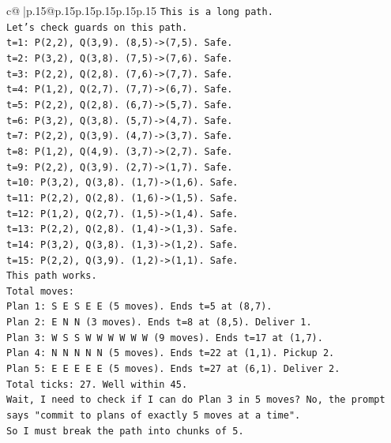 \documentclass{article}
\begin{document}
{\begin{supertabular}{c@{$\;$}|p{.15\linewidth}@{}p{.15\linewidth}p{.15\linewidth}p{.15\linewidth}p{.15\linewidth}p{.15\linewidth}}
{{{\texttt{This is a long path.} \\
\texttt{Let's check guards on this path.} \\
\texttt{t=1: P(2,2), Q(3,9). (8,5){-}>(7,5). Safe.} \\
\texttt{t=2: P(3,2), Q(3,8). (7,5){-}>(7,6). Safe.} \\
\texttt{t=3: P(2,2), Q(2,8). (7,6){-}>(7,7). Safe.} \\
\texttt{t=4: P(1,2), Q(2,7). (7,7){-}>(6,7). Safe.} \\
\texttt{t=5: P(2,2), Q(2,8). (6,7){-}>(5,7). Safe.} \\
\texttt{t=6: P(3,2), Q(3,8). (5,7){-}>(4,7). Safe.} \\
\texttt{t=7: P(2,2), Q(3,9). (4,7){-}>(3,7). Safe.} \\
\texttt{t=8: P(1,2), Q(4,9). (3,7){-}>(2,7). Safe.} \\
\texttt{t=9: P(2,2), Q(3,9). (2,7){-}>(1,7). Safe.} \\
\texttt{t=10: P(3,2), Q(3,8). (1,7){-}>(1,6). Safe.} \\
\texttt{t=11: P(2,2), Q(2,8). (1,6){-}>(1,5). Safe.} \\
\texttt{t=12: P(1,2), Q(2,7). (1,5){-}>(1,4). Safe.} \\
\texttt{t=13: P(2,2), Q(2,8). (1,4){-}>(1,3). Safe.} \\
\texttt{t=14: P(3,2), Q(3,8). (1,3){-}>(1,2). Safe.} \\
\texttt{t=15: P(2,2), Q(3,9). (1,2){-}>(1,1). Safe.} \\
\texttt{This path works.} \\
\texttt{Total moves:} \\
\texttt{Plan 1: S E S E E (5 moves). Ends t=5 at (8,7).} \\
\texttt{Plan 2: E N N (3 moves). Ends t=8 at (8,5). Deliver 1.} \\
\texttt{Plan 3: W S S W W W W W W (9 moves). Ends t=17 at (1,7).} \\
\texttt{Plan 4: N N N N N (5 moves). Ends t=22 at (1,1). Pickup 2.} \\
\texttt{Plan 5: E E E E E (5 moves). Ends t=27 at (6,1). Deliver 2.} \\
\texttt{Total ticks: 27. Well within 45.} \\
\texttt{Wait, I need to check if I can do Plan 3 in 5 moves? No, the prompt says "commit to plans of exactly 5 moves at a time".} \\
\texttt{So I must break the path into chunks of 5.} \\
}}}
\end{supertabular}}
\end{document}

